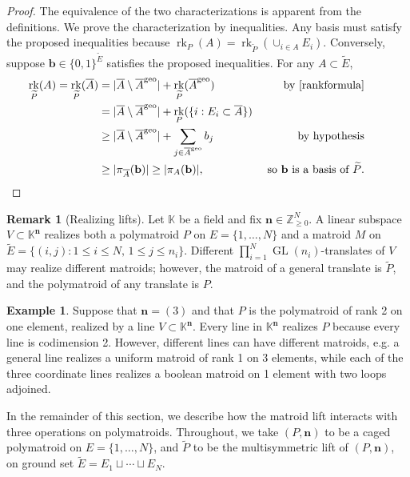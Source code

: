\documentclass[11pt]{article}
\theoremstyle{definition}
\newtheorem{exam}[theo]{Example}
\newtheorem{rema}[theo]{Remark}
\numberwithin{equation}{section}
\DeclareMathOperator{\GL}{GL}
\newcommand{\geo}{\mathrm{geo}}
\newcommand{\N}{\mathbb{Z}_{\geq 0}}
\newcommand{\K}{\mathbb{K}}
\DeclareMathOperator{\rk}{rk}
\begin{document}
\begin{proof}
  The equivalence of the two characterizations is apparent from the definitions. We prove the characterization by inequalities.
  Any basis must satisfy the proposed inequalities because $\rk_P(A) = \rk_{\widetilde P}(\cup_{i \in A} E_i)$.
  Conversely, suppose $\mathbf b \in \{0,1\}^{\widetilde E}$ satisfies the proposed inequalities. For any  $A \subset \widetilde E$,
  \begin{align*}
    \rk_{\widetilde P}(A) = \rk_{\widetilde P}(\overline{A})
    &= |\overline A \setminus {\overline A}^\geo| + \rk_{\widetilde P}(\overline A^\geo) & \text{ by \cref{rankformula}}&\\
    & = |\overline A \setminus {\overline A}^\geo| + \rk_P(\{i : E_i \subset \overline A\})  &\\
    &\geq |\overline A \setminus {\overline A}^\geo| + \sum_{j \in {\overline A}^\geo} b_j & \text{by hypothesis}&\\
    &\geq |\pi_{\overline A}(\mathbf b)| \geq |\pi_A(\mathbf b)|, & \text{  so $\mathbf b$ is a basis of $\widetilde P$.} &\qquad \qedhere
  \end{align*}
\end{proof}

\begin{rema}[Realizing lifts]\label{realizablelift}
  Let $\K$ be a field and fix $\mathbf n \in \N^N$.
  A linear subspace $V \subset \K^{\mathbf n}$ realizes both a polymatroid $P$ on $E = \{1, \ldots, N\}$ and a matroid $M$ on $\widetilde E = \{(i,j) : 1 \leq i \leq N, \, 1 \leq j \leq n_i\}$.
  Different  $\prod_{i=1}^N \GL(n_i)$-translates of $V$ may realize different matroids; however, the matroid of a general translate is $\widetilde P$, and the polymatroid of any translate is $P$.
\end{rema}
\begin{exam}
  Suppose that $\mathbf n = (3)$ and that $P$ is the polymatroid of rank 2 on one element, realized by a line $V \subset \K^{\mathbf n}$. Every line in $\K^{\mathbf n}$ realizes $P$ because every line is codimension 2. However, different lines can have different matroids, e.g. a general line realizes a uniform matroid of rank 1 on 3 elements, while each of the three coordinate lines realizes a boolean matroid on 1 element with two loops adjoined.
\end{exam}

In the remainder of this section, we describe how the matroid lift interacts with three operations on polymatroids.
Throughout, we take $(P, \mathbf n)$ to be a caged polymatroid on $E = \{1, \ldots, N\}$, and $\widetilde P$ to be the multisymmetric lift of $(P, \mathbf n)$, on ground set $\widetilde E = E_1 \sqcup \cdots \sqcup E_N$.
\end{document}
